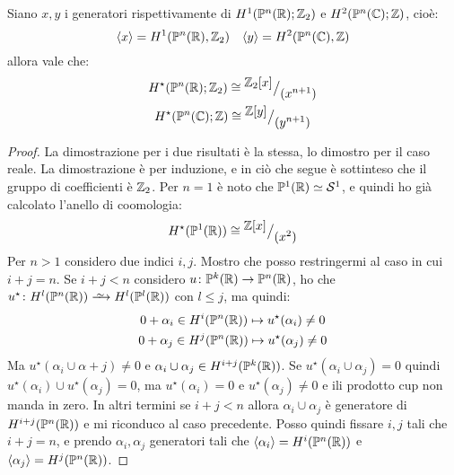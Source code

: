\begin{theorem}
  Siano $ x, y $ i generatori rispettivamente di $ H^1(\mathbb{P}^{n} (\mathbb{R}); \mathbb{Z}_2) $ e $ H^2(\mathbb{P}^{n} (\mathbb{C}); \mathbb{Z}) $,
  cioè:
  \[
    \langle x \rangle = H^1(\mathbb{P}^{n} (\mathbb{R}), \mathbb{Z}_2)  \quad \langle y \rangle = H^2(\mathbb{P}^{n} (\mathbb{C}), \mathbb{Z})
  \]
  allora vale che:
  \begin{gather*}
    H^\star(\mathbb{P}^{n} (\mathbb{R}); \mathbb{Z}_2) \cong {^{\textstyle \mathbb{Z}_2[x]}\big/_{\textstyle (x^{n+1})}} \\
    H^\star(\mathbb{P}^{n} (\mathbb{C}); \mathbb{Z}) \cong {^{\textstyle \mathbb{Z}[y]}\big/_{\textstyle (y^{n+1})}}
  \end{gather*}
\end{theorem}
\begin{proof}
  La dimostrazione per i due risultati è la stessa, lo dimostro per il caso
  reale. La dimostrazione è per induzione, e in ciò che segue è sottinteso che
  il gruppo di coefficienti è $ \mathbb{Z}_2 $.
  Per $ n = 1 $ è noto che $ \mathbb{P}^{1} (\mathbb{R}) \simeq \mathcal{S}^{1} $, e quindi ho già calcolato
  l'anello di coomologia:
  \[
    H^\star(\mathbb{P}^{1} (\mathbb{R})) \cong {^{\textstyle \mathbb{Z}[x]}\big/_{\textstyle (x^2)}}
  \]
  Per $ n > 1 $ considero due indici $ i, j $. Mostro che posso restringermi al
  caso in cui $ i + j = n $. Se $ i + j < n $ considero
  $ u \colon \mathbb{P}^{k} (\mathbb{R}) \to \mathbb{P}^{n} (\mathbb{R}) $, ho che $ u^\star \colon H^l(\Pjr{n}) \homoto H^l(\Pjr{l}) $
  con $ l \leq j $, ma quindi:
  \begin{gather*}
    0 + \alpha_i \in H^i(\mathbb{P}^{n} (\mathbb{R})) \mapsto u^\star(\alpha_i) \not = 0 \\
    0 + \alpha_j \in H^j(\mathbb{P}^{n} (\mathbb{R})) \mapsto u^\star(\alpha_j) \not = 0
  \end{gather*}
  Ma $ u^\star(\alpha_i \cup \alpha+j) \not = 0 $ e $ \alpha_i \cup \alpha_j \in H^{i+j}(\mathbb{P}^{k} (\mathbb{R})) $. Se $
  u^\star(\alpha_i \cup \alpha_j) = 0 $ quindi $ u^\star(\alpha_i) \cup u^\star(\alpha_j) = 0 $, ma $ u^\star(\alpha_i) = 0 $
  e $ u^\star(\alpha_j) \not = 0 $ e ili prodotto cup non manda in zero. In altri termini
  se $ i + j < n $ allora $ \alpha_i \cup \alpha_j $ è generatore di $ H^{i+j}(\mathbb{P}^{n} (\mathbb{R})) $ e
  mi riconduco al caso precedente. Posso quindi fissare $ i, j $ tali che $ i +
  j = n $, e prendo $ \alpha_i, \alpha_j $ generatori tali che $ \langle\alpha_i\rangle = H^i(\mathbb{P}^{n} (\mathbb{R})) $ e
  $ \langle\alpha_j\rangle = H^j(\mathbb{P}^{n} (\mathbb{R})) $.


\end{proof}
